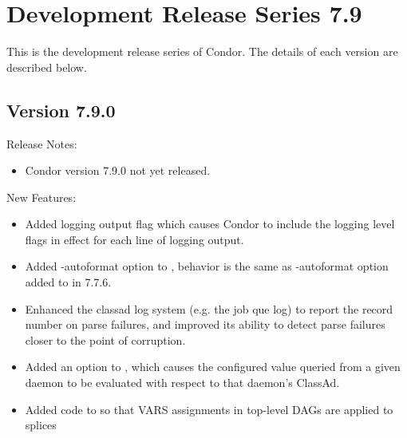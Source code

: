
\section{\label{sec:History-7-9}Development Release Series 7.9}

This is the development release series of Condor.
The details of each version are described below.

\subsection*{\label{sec:New-7-9-0}Version 7.9.0}

\noindent Release Notes:

\begin{itemize}

\item Condor version 7.9.0 not yet released.

\end{itemize}


\noindent New Features:

\begin{itemize}

\item Added logging output flag  which causes Condor to include the logging level
flags in effect for each line of logging output.

\item Added -autoformat option to , behavior is the same as -autoformat option
added to  in 7.7.6.

\item Enhanced the classad log system (e.g. the job que log) to report the record number on parse failures, 
and improved its ability to detect parse failures closer to the point of corruption.

\item Added an  option to , which causes the configured value queried from
a given daemon to be evaluated with respect to that daemon's ClassAd.

\item Added code to  so that VARS assignments in top-level DAGs are applied to splices

\end{itemize}

